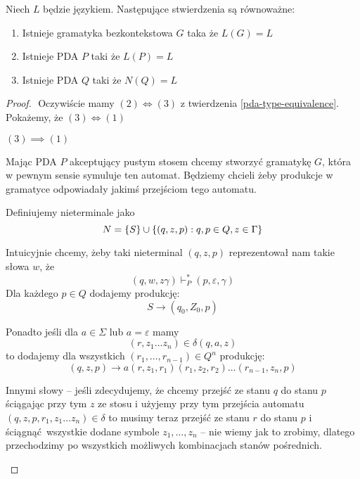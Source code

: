 \begin{theorem}
    Niech \( L \) będzie językiem. Następujące stwierdzenia są równoważne:
    \begin{enumerate}
        \item Istnieje gramatyka bezkontekstowa \( G \) taka że \( L(G) = L \)
        \item Istnieje PDA \( P \) taki że \( L(P) = L \)
        \item Istnieje PDA \( Q \) taki że \( N(Q) = L \)
    \end{enumerate}
\end{theorem}
\begin{proof} \( \)
    Oczywiście mamy \( (2) \iff (3) \) z twierdzenia \ref{pda-type-equivalence}.
    Pokażemy, że \( (3) \iff (1) \)
    
    
    \begin{description}
        
   
        \item \( (3) \implies (1) \)
        
        Mając PDA \( P \) akceptujący pustym stosem chcemy stworzyć gramatykę \( G \), która w pewnym sensie symuluje ten automat. Będziemy chcieli żeby produkcje w gramatyce odpowiadały jakimś przejściom tego automatu. 
        
        Definiujemy nieterminale jako 
        \[ N = \set{S} \cup\set{(q, z, p) : q, p \in Q, z \in \Gamma} \]
        
        Intuicyjnie chcemy, żeby taki nieterminal \( (q, z, p) \) reprezentował nam takie słowa \( w \), że 
        \[
            (q, w, z\gamma) \vdash_P^* (p, \varepsilon, \gamma)
        \]
        Dla każdego \( p \in Q \) dodajemy produkcję:
        \[
            S \rightarrow (q_0, Z_0, p)
        \]
        
        Ponadto jeśli dla \( a \in \Sigma \) lub \( a = \varepsilon \) mamy
        \[
            (r, z_1 \dots z_n) \in \delta(q, a, z)
        \]
        to dodajemy dla wszystkich \( (r_1, \dots, r_{n-1}) \in Q^n \) produkcję:
        \[
            (q, z, p) \rightarrow a(r, z_1, r_1)(r_1, z_2, r_2)\dots(r_{n-1}, z_n, p)
        \]
        
        Innymi słowy -- jeśli zdecydujemy, że chcemy przejść ze stanu \( q \) do stanu \( p \) ściągając przy tym \( z \) ze stosu i użyjemy przy tym 
        przejścia automatu \( (q, z, p, r_1, z_1\dots z_n) \in \delta \)
        to musimy teraz przejść ze stanu \( r \) do stanu \( p \) i ściągnąć wszystkie dodane symbole \( z_1, \dots, z_n \) -- nie wiemy jak to zrobimy, dlatego przechodzimy po wszystkich możliwych kombinacjach stanów pośrednich.
        

\end{description}
\end{proof}
